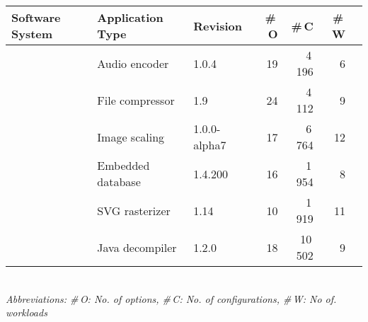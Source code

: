 \begin{tabularx}{\linewidth}{lllrrrr}
		\toprule
		\textbf{Software System} &  \textbf{Application Type} & \textbf{Revision} & \textbf{ \#\,O} & \textbf{\#\,C} & \textbf{\#\,W}  \\
		\midrule
		\jumper & Audio encoder & 1.0.4 & 19 & 4\,196 & 6   \\
		
		\kanzi & File compressor & 1.9 & 24 & 4\,112 & 9 \\
			
		\dconvert & Image scaling & 1.0.0-alpha7 & 17 & 6\,764 & 12  \\
				
		\htwo & Embedded database & 1.4.200 & 16 & 1\,954  & 8  \\
		
		\batik & SVG rasterizer & 1.14 & 10 & 1\,919 &  11  \\
		
		\jadx & Java decompiler & 1.2.0 & 18 & 10\,502 & 9  \\
\bottomrule

\end{tabularx}\\
{\vspace{1mm}\textit{Abbreviations: \#\,O: No. of options, \#\,C: No. of configurations, \#\,W: No of. workloads}}
